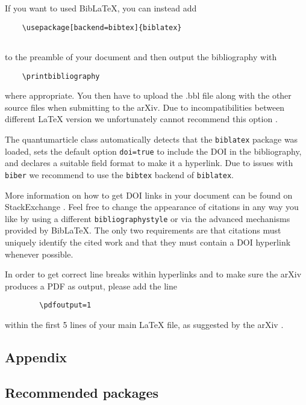 \documentclass[a4paper,noarxiv,onecolumn]{quantumarticle}
\begin{document}
	If you want to used BibLaTeX, you can instead add
	\begin{verbatim}
	\usepackage[backend=bibtex]{biblatex}
	
	\end{verbatim}
	to the preamble of your document and then output the bibliography with
	\begin{verbatim}
	\printbibliography
	\end{verbatim}
	where appropriate.
	You then have to upload the .bbl file along with the other source files when submitting to the arXiv.
	Due to incompatibilities between different LaTeX version we unfortunately cannot recommend this option \cite{biblatexsubmittingtothearxiv}.
	
	The quantumarticle class automatically detects that the \texttt{biblatex} package was loaded, sets the default option \texttt{doi=true} to include the DOI in the bibliography, and declares a suitable field format to make it a hyperlink.
	Due to issues with \texttt{biber} we recommend to use the \texttt{bibtex} backend of \texttt{biblatex}.
	
	More information on how to get DOI links in your document can be found on StackExchange \cite{howtogetdoilinksinbibliography,automaticallyaddingdoifieldstoahandmadebibliography}.
	Feel free to change the appearance of citations in any way you like by using a different \texttt{bibliographystyle} or via the advanced mechanisms provided by BibLaTeX.
	The only two requirements are that citations must uniquely identify the cited work and that they must contain a DOI hyperlink whenever possible.
	
	\begin{theorem}[Use \texttt{\textbackslash pdfoutput=1}]
		In order to get correct line breaks within hyperlinks and to make sure the arXiv produces a PDF as output, please add the line 
		\begin{verbatim}
		\pdfoutput=1
		\end{verbatim}
		within the first 5 lines of your main LaTeX file, as suggested by the arXiv \cite{arxivpdfoutput}.
	\end{theorem}
	
	\subsection{Appendix}
	
	\subsection{Recommended packages}
	
\end{document}
